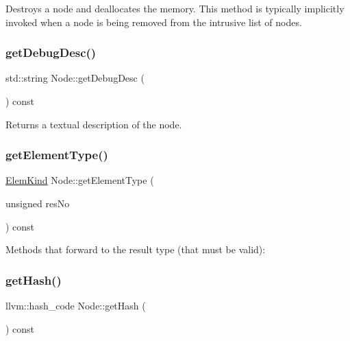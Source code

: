 Destroys a node and deallocates the memory. This method is typically implicitly invoked when a node is being removed from the intrusive list of nodes. \mbox{\label{classglow_1_1_node_a0d828791f94bf520faf9c00c2f678135}} 
\subsubsection{\texorpdfstring{get\+Debug\+Desc()}{getDebugDesc()}}
{\footnotesize\ttfamily std\+::string Node\+::get\+Debug\+Desc (\begin{DoxyParamCaption}{ }\end{DoxyParamCaption}) const}

\begin{DoxyReturn}{Returns}
a textual description of the node. 
\end{DoxyReturn}
\mbox{\label{classglow_1_1_node_ac8ff415675b1bdffe7ed357d87932023}} 
\subsubsection{\texorpdfstring{get\+Element\+Type()}{getElementType()}}
{\footnotesize\ttfamily \hyperlink{namespaceglow_ab92e14a94329daf4083db670e95fbcdf}{Elem\+Kind} Node\+::get\+Element\+Type (\begin{DoxyParamCaption}\item[{unsigned}]{res\+No }\end{DoxyParamCaption}) const}

Methods that forward to the result type (that must be valid)\+: \mbox{\label{classglow_1_1_node_a64701a874397cb291e62b74d782f8729}} 
\subsubsection{\texorpdfstring{get\+Hash()}{getHash()}}
{\footnotesize\ttfamily llvm\+::hash\+\_\+code Node\+::get\+Hash (\begin{DoxyParamCaption}{ }\end{DoxyParamCaption}) const}

